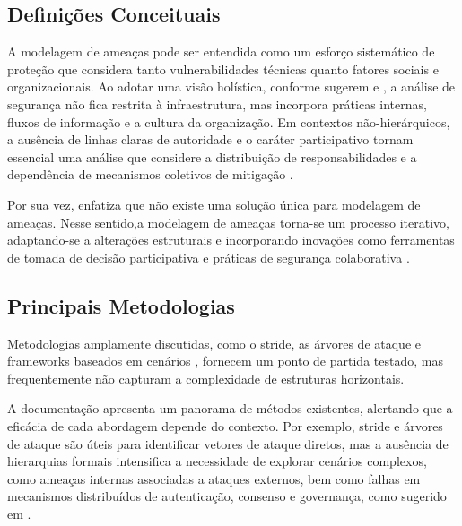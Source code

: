 \subsection{Definições Conceituais} 
\label{sec:definicoes_conceituais}

A modelagem de ameaças pode ser entendida como um esforço sistemático de
proteção que considera tanto vulnerabilidades técnicas quanto fatores
sociais e organizacionais. Ao adotar uma visão holística, conforme sugerem
\cite{ThreatModelingAsABasisForSecurityRequirements} e
\cite{AdvancedThreatModeling}, a análise de segurança não fica restrita à
infraestrutura, mas incorpora práticas internas, fluxos de informação e a
cultura da organização. Em contextos não-hierárquicos, a ausência de linhas
claras de autoridade e o caráter participativo tornam essencial uma análise
que considere a distribuição de responsabilidades e a dependência de
mecanismos coletivos de mitigação \cite{Colbac}.

Por sua vez, \cite{DemystifyingTheThreatModelingProcess} enfatiza que não
existe uma solução única para modelagem de ameaças. Nesse sentido,a
modelagem de ameaças torna-se um processo iterativo, adaptando-se a
alterações estruturais e incorporando inovações como ferramentas de
tomada de decisão participativa e práticas de segurança colaborativa
\cite{SecurityCardsToolkit, ParticipatoryThreatModelling}.

\subsection{Principais Metodologias}
\label{sec:principais_metodologias}

Metodologias amplamente discutidas, como o \gls{stride}, as árvores de
ataque e frameworks baseados em cenários
\cite{EvaluationofCompetingThreatModeling}, fornecem um ponto de partida
testado, mas frequentemente não capturam a complexidade de estruturas
horizontais.

A documentação \cite{ThreatModelingASummaryOfAvailableMethods} apresenta um
panorama de métodos existentes, alertando que a eficácia de cada abordagem
depende do contexto. Por exemplo, \gls{stride} e árvores de ataque são
úteis para identificar vetores de ataque diretos, mas a ausência de
hierarquias formais intensifica a necessidade de explorar cenários
complexos, como ameaças internas associadas a ataques externos, bem como
falhas em mecanismos distribuídos de autenticação, consenso e governança,
como sugerido em \cite{Colbac, AttackTrees, STRIDEthreatmodelingforcyberphysical}.

